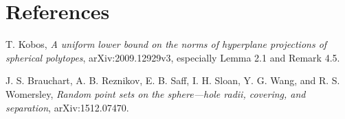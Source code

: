 \documentclass[11pt]{article}
\begin{document}
\section*{References}
\begin{enumerate}[label={[\arabic*]},itemsep=3pt,topsep=3pt]
\item T. Kobos, \emph{A uniform lower bound on the norms of hyperplane
projections of spherical polytopes}, arXiv:2009.12929v3, especially
Lemma 2.1 and Remark 4.5.
\item J. S. Brauchart, A. B. Reznikov, E. B. Saff, I. H. Sloan,
Y. G. Wang, and R. S. Womersley, \emph{Random point sets on the
sphere---hole radii, covering, and separation}, arXiv:1512.07470.
\end{enumerate}
\end{document}
